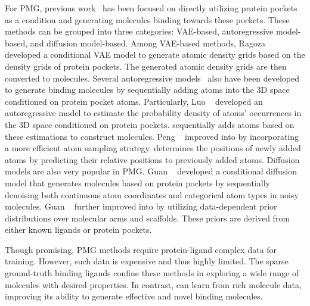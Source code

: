 For PMG, previous work~\cite{luo2021sbdd,peng22pocket2mol,guan2023targetdiff,guan2023decompdiff} has been focused on directly utilizing protein pockets as a condition and generating molecules binding towards these pockets.
%
These methods can be grouped into three categories: VAE-based, autoregressive model-based, and diffusion model-based.
%
Among VAE-based methods, Ragoza \etal~\cite{ragoza2022chemsci} developed a conditional VAE model to generate atomic density grids based on the density grids of protein pockets.
%
The generated atomic density grids are then converted to molecules.
%
Several autoregressive models~\cite{luo2021sbdd,peng22pocket2mol,liu2022} also have been developed to generate binding molecules by sequentially adding atoms into the 3D space conditioned on 
protein pocket atoms. 
%
Particularly, Luo \etal~\cite{luo2021sbdd} developed an autoregressive model \AR to estimate the probability density of atoms' occurrences in the 3D space conditioned on protein pockets.
%
\AR sequentially adds atoms based on these estimations to construct molecules. 
%
Peng \etal~\cite{peng22pocket2mol} improved \AR into \pockettwomol by incorporating a more efficient atom sampling strategy.
%
\pockettwomol determines the positions of newly added atoms by predicting their relative positions to previously added atoms.
%
Diffusion models are also very popular in PMG.
%
Guan \etal~\cite{guan2023targetdiff} developed a conditional diffusion model \targetdiff that generates molecules based on protein pockets by sequentially denoising both continuous atom coordinates and categorical atom types in noisy molecules. 
%
Guan \etal~\cite{guan2023decompdiff} further improved \targetdiff into \decompdiff by utilizing data-dependent prior distributions over molecular arms and scaffolds.
%
These priors are derived from either known ligands or protein pockets.

%
Though promising, %
PMG methods require protein-ligand complex data for training.
%
However, such data is expensive and thus highly limited.
%
%
{The sparse ground-truth binding ligands}
%
confine %
these methods in exploring a wide range of molecules with desired properties.  
%
In contrast, \method can learn from rich molecule data, improving its ability to generate effective and novel binding molecules.

